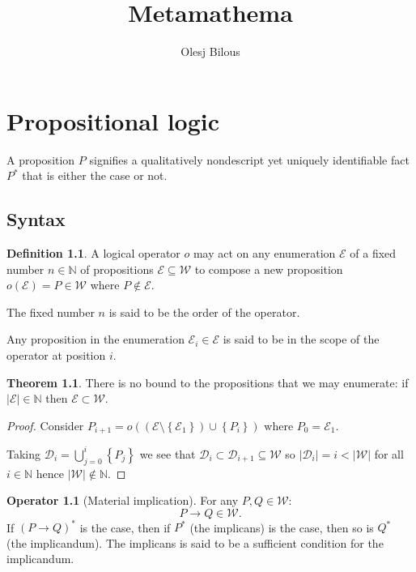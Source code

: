 \documentclass{amsbook}
\newcommand{\setsm}[1]{\left\{#1\right\}}
\newcommand{\wffs}{\mathcal W}
\theoremstyle{definition}
\newtheorem{op}{Operator}[chapter]
\newtheorem{thm}{Theorem}[section]
\newtheorem{dfn}{Definition}[section]
\begin{document}
\title{Metamathema}
\author{Olesj Bilous}
\maketitle

\chapter{Propositional logic}

A proposition $P$ signifies a qualitatively nondescript yet uniquely identifiable fact $P^*$ that is either the case or not.

\section{Syntax}

\begin{dfn}
    A logical operator $o$ may act on any enumeration $\mathcal E$ of a fixed number $n \in \mathbb N$ of propositions $\mathcal E \subseteq \mathcal W$ to compose a new proposition $o(\mathcal E) = P \in \mathcal W$ where $P \notin \mathcal E$.

    The fixed number $n$ is said to be the order of the operator.

    Any proposition in the enumeration $\mathcal E_i \in \mathcal E$ is said to be in the scope of the operator at position $i$.
\end{dfn}

\begin{thm}
    There is no bound to the propositions that we may enumerate: if $|\mathcal E| \in \mathbb N$ then $\mathcal E \subset \mathcal W$.
    \begin{proof}
        Consider $P_{i+1} = o((\mathcal E \setminus \setsm {\mathcal E_1}) \cup \setsm {P_i})$ where $P_0 = \mathcal E_1$.

        Taking $\mathcal D_i = \bigcup_{j=0}^i \setsm {P_j}$ we see that $\mathcal D_i \subset \mathcal D_{i+1} \subseteq \wffs$ so $|\mathcal D_i| = i < |\mathcal W|$ for all $i \in \mathbb N$ hence $|\mathcal W| \notin \mathbb N$.
    \end{proof}
\end{thm}


\begin{op}[Material implication]
    For any $P, Q \in \wffs$:
    $$
        P \rightarrow Q \in \wffs.
    $$
    If $(P \rightarrow Q)^*$ is the case, then if $P^*$ (the implicans) is the case, then so is $Q^*$ (the implicandum). The implicans is said to be a sufficient condition for the implicandum.
\end{op}
\end{document}

